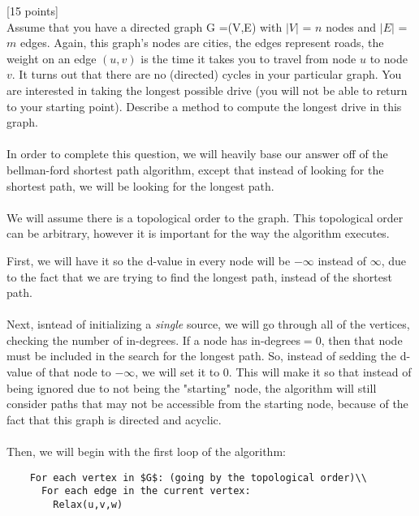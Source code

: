 \documentclass[12pt]{article}
\newcounter{ques}
\newenvironment{question}{\stepcounter{ques}{\noindent\bf Question \arabic{ques}:}}{\vspace{5mm}}
\begin{document}
\begin{question}[15 points]\\
  Assume that you have a directed graph G =(V,E) with $|V|$  = $n$ nodes and $|E|$ = $m$ edges. Again, this graph's nodes are cities, the edges  represent roads,  the weight on an edge $(u,v)$ is the time it takes you to travel from node $u$ to node $v$.  It turns out that there are no (directed) cycles in your particular graph.
  You are interested in taking the longest possible drive (you will not be able to return to your starting point).
  Describe a method to compute the longest drive in this graph.\\\\

  In order to complete this question, we will heavily base our answer off of the bellman-ford shortest path algorithm, except that instead of looking for the shortest path, we will be looking for the longest path.\\\\

  We will assume there is a topological order to the graph. This topological order can be arbitrary, however it is important for the way the algorithm executes.

  First, we will have it so the d-value in every node will be $-\infty$ instead of $\infty$, due to the fact that we are trying to find the longest path, instead of the shortest path.\\\\

  Next, isntead of initializing a \textit{single} source, we will go through all of the vertices, checking the number of in-degrees. If a node has in-degrees$=0$, then that node must be included in the search for the longest path. So, instead of sedding the d-value of that node to $-\infty$, we will set it to $0$. This will make it so that instead of being ignored due to not being the "starting" node, the algorithm will still consider paths that may not be accessible from the starting node, because of the fact that this graph is directed and acyclic.\\\\



  Then, we will begin with the first loop of the algorithm:\\
  \begin{verbatim}
    For each vertex in $G$: (going by the topological order)\\
      For each edge in the current vertex:
        Relax(u,v,w)


\end{verbatim}
\end{question}
\end{document}

